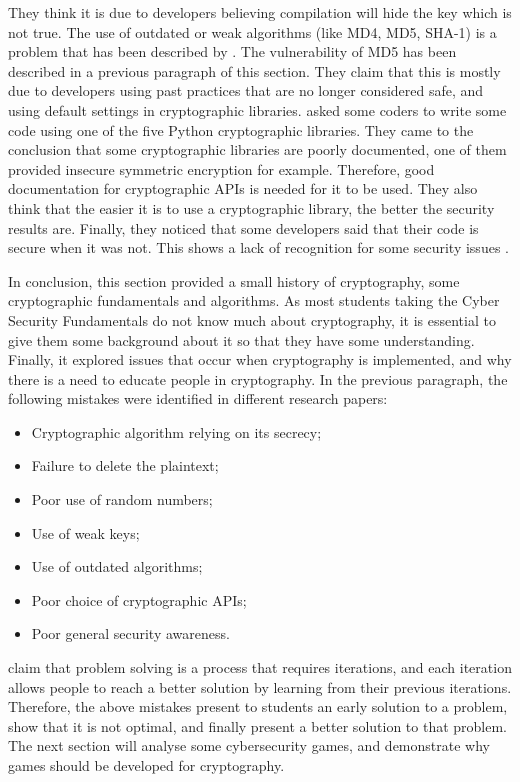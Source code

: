 \documentclass{l4proj}
\begin{document}
They think it is due to developers believing compilation will hide the key which is not true.
The use of outdated or weak algorithms (like MD4, MD5, SHA-1) is a problem that has been described by \citet{lazar_why_nodate}.
The vulnerability of MD5 has been described in a previous paragraph of this section.
They claim that this is mostly due to developers using past practices that are no longer considered safe, and using default settings in cryptographic libraries.
\citet{acar_comparing_2017} asked some coders to write some code using one of the five Python cryptographic libraries.
They came to the conclusion that some cryptographic libraries are poorly documented, one of them provided insecure symmetric encryption for example.
Therefore, good documentation for cryptographic APIs is needed for it to be used.
They also think that the easier it is to use a cryptographic library, the better the security results are.
Finally, they noticed that some developers said that their code is secure when it was not. This shows a lack of recognition for some security issues \citep{lazar_why_nodate}.

In conclusion, this section provided a small history of cryptography, some cryptographic fundamentals and algorithms. 
As most students taking the Cyber Security Fundamentals do not know much about cryptography, 
it is essential to give them some background about it so that they have some understanding.
Finally, it explored issues that occur when cryptography is implemented, and why there is a need to educate people in cryptography.
In the previous paragraph, the following mistakes were identified in different research papers:
\begin{itemize}
    \item Cryptographic algorithm relying on its secrecy;
    \item Failure to delete the plaintext;
    \item Poor use of random numbers;
    \item Use of weak keys;
    \item Use of outdated algorithms;
    \item Poor choice of cryptographic APIs;
    \item Poor general security awareness.
\end{itemize}
\citet{eggleton_value_2001} claim that problem solving is a process that requires iterations, and each iteration allows
people to reach a better solution by learning from their previous iterations. 
Therefore, the above mistakes present to students an early solution to a problem, show that it is not optimal, and
finally present a better solution to that problem. 
The next section will analyse some cybersecurity games, and demonstrate why games should be developed for cryptography.
\end{document}

